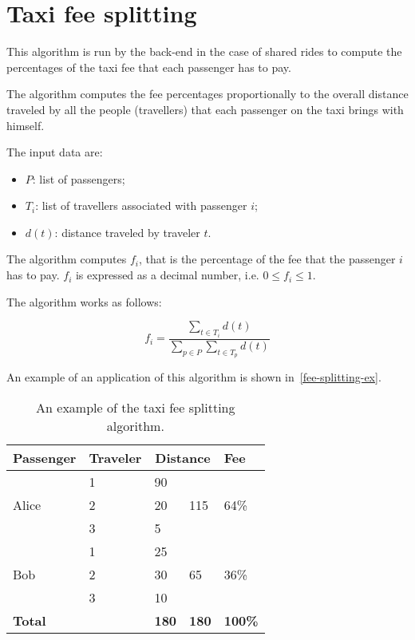 \section{Taxi fee splitting}
This algorithm is run by the back-end in the case of shared rides to compute the percentages of the taxi fee that each passenger has to pay.

The algorithm computes the fee percentages proportionally to the overall distance traveled by all the people (travellers) that each passenger on the taxi brings with himself.

The input data are:
\begin{itemize}
    \item $P$: list of passengers;
    \item $T_i$: list of travellers associated with passenger $i$;
    \item $d(t)$: distance traveled by traveler $t$.
\end{itemize}

The algorithm computes $f_i$, that is the percentage of the fee that the passenger $i$ has to pay.
$f_i$ is expressed as a decimal number, i.e. $0 \le f_i \le 1$.

The algorithm works as follows:

\begin{equation}
    f_i = \dfrac
        {\displaystyle \sum_{t \in T_i} d(t)}
        {\displaystyle \sum_{p \in P} \sum_{t \in T_p} d(t)}
\end{equation}

An example of an application of this algorithm is shown in~\autoref{fee-splitting-ex}.

\begin{table}
\begin{center}
\begin{tabular}{ l  l  l  l  l }
    \hline
    \textbf{Passenger} & \textbf{Traveler} & \multicolumn{2}{c}{\textbf{Distance}} & \textbf{Fee} \\
    \hline
    \multirow{3}{*}{Alice} & 1 & 90 & \multirow{3}{*}{115} & \multirow{3}{*}{64\%} \\
    & 2 & 20 & & \\
    & 3 & 5 & & \\
    \hline
    \multirow{3}{*}{Bob} & 1 & 25 & \multirow{3}{*}{65} & \multirow{3}{*}{36\%} \\
    & 2 & 30 & & \\
    & 3 & 10 & & \\
    \hline
    \textbf{Total} & & \textbf{180} & \textbf{180} & \textbf{100\%} \\
    \hline
\end{tabular}
\caption{An example of the taxi fee splitting algorithm.}
\label{fee-splitting-ex}
\end{center}
\end{table}
